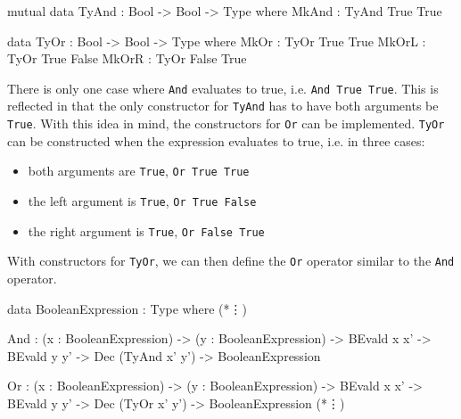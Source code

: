     \begin{code}[label={des:tyand-or}, caption={The constructors for true \texttt{And} and \texttt{Or} statements}, escapeinside={(*}{*)}]
        mutual
            data TyAnd : Bool -> Bool -> Type where
                MkAnd  : TyAnd True True
            
            data TyOr : Bool -> Bool -> Type where
                MkOr  : TyOr True True
                MkOrL : TyOr True False
                MkOrR : TyOr False True
    \end{code}

    There is only one case where \texttt{And} evaluates to true, i.e. \texttt{And True True}. This is reflected in that the only constructor for \texttt{TyAnd} has to have both arguments be \texttt{True}. With this idea in mind, the constructors for \texttt{Or} can be implemented. \texttt{TyOr} can be constructed when the expression evaluates to true, i.e. in three cases:
    \begin{itemize}
        \item both arguments are \texttt{True}, \texttt{Or True True}
        \item the left argument is \texttt{True}, \texttt{Or True False}
        \item the right argument is \texttt{True}, \texttt{Or False True}
    \end{itemize}
    
    With constructors for \texttt{TyOr}, we can then define the \texttt{Or} operator similar to the \texttt{And} operator.
    
    \begin{code}[caption={The definitions of \texttt{And} and \texttt{Or}}, escapeinside={(*}{*)}]
            data BooleanExpression : Type where
                (*\vdots*)
                
                And :  (x : BooleanExpression)
                    -> (y : BooleanExpression)
                    -> BEvald x x'
                    -> BEvald y y'
                    -> Dec (TyAnd x' y')
                    -> BooleanExpression
                
                Or  :  (x : BooleanExpression)
                    -> (y : BooleanExpression)
                    -> BEvald x x'
                    -> BEvald y y'
                    -> Dec (TyOr x' y')
                    -> BooleanExpression
                (*\vdots*)
    \end{code}

